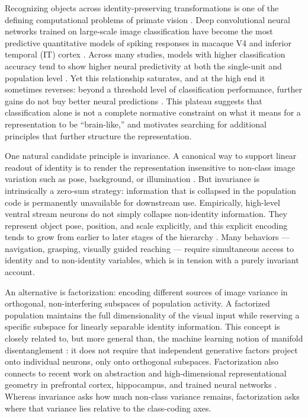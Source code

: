 \documentclass[11pt]{article}
\begin{document}
Recognizing objects across identity-preserving transformations is one of the
defining computational problems of primate vision \citep{dicarlo2007untangling,
dicarlo2012how}. Deep convolutional neural networks trained on large-scale
image classification have become the most predictive quantitative models of
spiking responses in macaque V4 and inferior temporal (IT) cortex
\citep{yamins2014performance, khalighrazavi2014deep, yamins2016using}. Across
many studies, models with higher classification accuracy tend to show higher
neural predictivity at both the single-unit and population level
\citep{majaj2015simple, schrimpf2020integrative}. Yet this relationship
saturates, and at the high end it sometimes reverses: beyond a threshold
level of classification performance, further gains do not buy better neural
predictions \citep{schrimpf2020integrative}. This plateau suggests that
classification alone is not a complete normative constraint on what it means
for a representation to be ``brain-like,'' and motivates searching for
additional principles that further structure the representation.

One natural candidate principle is invariance. A canonical way to support
linear readout of identity is to render the representation insensitive to
non-class image variation such as pose, background, or illumination
\citep{dicarlo2007untangling}. But invariance is intrinsically a zero-sum
strategy: information that is collapsed in the population code is
permanently unavailable for downstream use. Empirically, high-level ventral
stream neurons do not simply collapse non-identity information. They
represent object pose, position, and scale explicitly, and this explicit
encoding tends to grow from earlier to later stages of the hierarchy
\citep{hong2016explicit, rust2012balanced, freiwald2010functional}. Many
behaviors --- navigation, grasping, visually guided reaching --- require
simultaneous access to identity and to non-identity variables, which is in
tension with a purely invariant account.

An alternative is factorization: encoding different sources of image variance
in orthogonal, non-interfering subspaces of population activity. A factorized
population maintains the full dimensionality of the visual input while
reserving a specific subspace for linearly separable identity information.
This concept is closely related to, but more general than, the machine
learning notion of manifold disentanglement \citep{higgins2017beta}: it does
not require that independent generative factors project onto individual
neurons, only onto orthogonal subspaces. Factorization also connects to
recent work on abstraction and high-dimensional representational geometry in
prefrontal cortex, hippocampus, and trained neural networks
\citep{bernardi2020geometry, rigotti2013importance, fusi2016why,
stringer2019high, sorscher2022neural}. Whereas invariance asks how much
non-class variance remains, factorization asks where that variance lies
relative to the class-coding axes.
\end{document}
